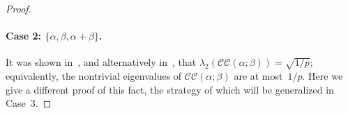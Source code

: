 \documentclass[10pt,a4paper]{article}
\theoremstyle{definition}
\newcommand{\CC}[2]{\mathcal{C}\mathcal{C}(#1;#2)}
\begin{document}
\begin{proof}
    
    
    \paragraph{Case 2: $\{\alpha,\beta,\alpha+\beta\}$.}
    It was shown in~\cite{KO18}, and alternatively in~\cite[Corollary 5.6]{HS19}, that $\lambda_2(\CC{\alpha}{\beta}) = \sqrt{1/p}$; equivalently, the nontrivial eigenvalues of $\CC{\alpha}{\beta}$ are at most~$1/p$. Here we give a different proof of this fact, the strategy of which will be generalized in Case~3.
    

\end{proof}
\end{document}
